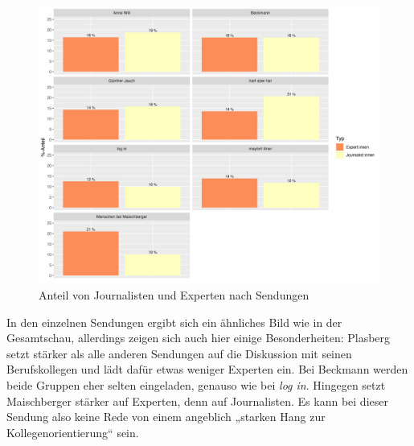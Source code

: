 \begin{figure}[ht]
	\centering
	\includegraphics[width=1\textwidth]{daten/grafiken/plot_journalisten_experten.png}
	\caption{Anteil von Journalisten und Experten nach Sendungen}
	\label{plot:journalisten_experten}
\end{figure}

In den einzelnen Sendungen ergibt sich ein ähnliches Bild wie in der Gesamtschau, allerdings zeigen sich auch hier einige Besonderheiten: Plasberg setzt stärker als alle anderen Sendungen auf die Diskussion mit seinen Berufskollegen und lädt dafür etwas weniger Experten ein. Bei Beckmann werden beide Gruppen eher selten eingeladen, genauso wie bei \textit{log in}. Hingegen setzt Maischberger stärker auf Experten, denn auf Journalisten. Es kann bei dieser Sendung also keine Rede von einem angeblich „starken Hang zur Kollegenorientierung“ \parencite{hachmeisterARDNurKeine2011} sein.

